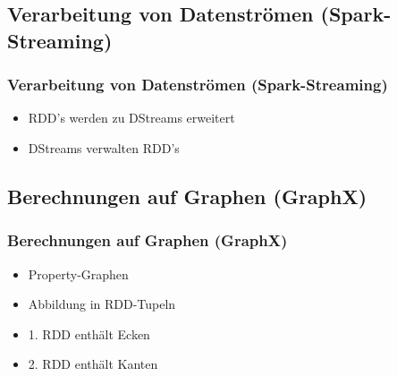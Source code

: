 \documentclass[hyperref={pdfpagelabels=false}]{beamer}
\begin{document}
\subsection{Verarbeitung von Datenströmen (Spark-Streaming)}
\begin{frame} [t]
\frametitle{Verarbeitung von Datenströmen (Spark-Streaming)}

\begin{itemize}
	\item RDD's werden zu DStreams erweitert
	\item DStreams verwalten RDD's
\end{itemize}

 {
	\begin{figure}[h]
		\centering
	\end{figure}
}
\end{frame}


\subsection{Berechnungen auf Graphen (GraphX)}
\begin{frame} [t]
\frametitle{Berechnungen auf Graphen (GraphX)}

\begin{itemize}
	\item Property-Graphen
	\item Abbildung in RDD-Tupeln
	\item 1. RDD enthält Ecken
	\item 2. RDD enthält Kanten	
\end{itemize}

 {
	\begin{figure}[h]
		\centering
	\end{figure}
}

\end{frame}
\end{document}
